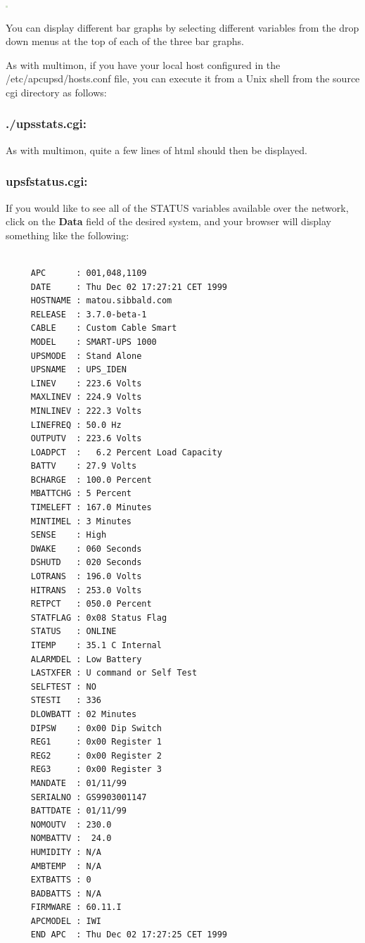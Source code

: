 {{{{{{{{
\includegraphics{./status.eps}  

You can display different bar graphs by selecting different variables from the
drop down menus at the top of each of the three bar graphs.  

As with multimon, if you have your local host configured in the
/etc/apcupsd/hosts.conf file, you can execute it from a Unix shell from the
source cgi directory as follows: 

\label{_005f_002fupsstats_005fcgi}

\subsubsection*{./upsstats.cgi:}

\label{index-upssstats-130}
\label{index-CGI_002c-upssstats-131}
As with multimon, quite a few lines of html should then be displayed. 

\label{upsfstatus_005fcgi}

\subsubsection*{upsfstatus.cgi:}

\label{index-upsfstatus-132}
\label{index-CGI_002c-upsfstatus-133}
If you would like to see all of the STATUS variables available over the
network, click on the {\bf Data} field of the desired system, and your browser
will display something like the following: 

\footnotesize
\begin{verbatim}
     
     APC      : 001,048,1109
     DATE     : Thu Dec 02 17:27:21 CET 1999
     HOSTNAME : matou.sibbald.com
     RELEASE  : 3.7.0-beta-1
     CABLE    : Custom Cable Smart
     MODEL    : SMART-UPS 1000
     UPSMODE  : Stand Alone
     UPSNAME  : UPS_IDEN
     LINEV    : 223.6 Volts
     MAXLINEV : 224.9 Volts
     MINLINEV : 222.3 Volts
     LINEFREQ : 50.0 Hz
     OUTPUTV  : 223.6 Volts
     LOADPCT  :   6.2 Percent Load Capacity
     BATTV    : 27.9 Volts
     BCHARGE  : 100.0 Percent
     MBATTCHG : 5 Percent
     TIMELEFT : 167.0 Minutes
     MINTIMEL : 3 Minutes
     SENSE    : High
     DWAKE    : 060 Seconds
     DSHUTD   : 020 Seconds
     LOTRANS  : 196.0 Volts
     HITRANS  : 253.0 Volts
     RETPCT   : 050.0 Percent
     STATFLAG : 0x08 Status Flag
     STATUS   : ONLINE
     ITEMP    : 35.1 C Internal
     ALARMDEL : Low Battery
     LASTXFER : U command or Self Test
     SELFTEST : NO
     STESTI   : 336
     DLOWBATT : 02 Minutes
     DIPSW    : 0x00 Dip Switch
     REG1     : 0x00 Register 1
     REG2     : 0x00 Register 2
     REG3     : 0x00 Register 3
     MANDATE  : 01/11/99
     SERIALNO : GS9903001147
     BATTDATE : 01/11/99
     NOMOUTV  : 230.0
     NOMBATTV :  24.0
     HUMIDITY : N/A
     AMBTEMP  : N/A
     EXTBATTS : 0
     BADBATTS : N/A
     FIRMWARE : 60.11.I
     APCMODEL : IWI
     END APC  : Thu Dec 02 17:27:25 CET 1999
\end{verbatim}
\normalsize

}}}}}}}}
